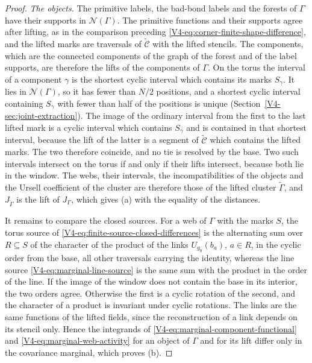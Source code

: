 \documentclass[11pt]{article}
\numberwithin{equation}{section}
\theoremstyle{remark}
\theoremstyle{plain}
\begin{document}
\begin{proof}
\emph{The objects.} The primitive labels, the bad-bond labels and the forests of $\Gamma$ have their supports in $\mathscr N(\Gamma)$. The primitive functions and their supports agree after lifting, as in the comparison preceding \eqref{V4-eq:corner-finite-shape-difference}, and the lifted marks are traversals of $\widetilde{\mathcal C}$ with the lifted stencils. The components, which are the connected components of the graph of the forest and of the label supports, are therefore the lifts of the components of $\Gamma$. On the torus the interval of a component $\gamma$ is the shortest cyclic interval which contains its marks $S_{\gamma}$. It lies in $\mathscr N(\Gamma)$, so it has fewer than $N/2$ positions, and a shortest cyclic interval containing $S_{\gamma}$ with fewer than half of the positions is unique (Section~\ref{V4-sec:joint-extraction}). The image of the ordinary interval from the first to the last lifted mark is a cyclic interval which contains $S_{\gamma}$ and is contained in that shortest interval, because the lift of the latter is a segment of $\widetilde{\mathcal C}$ which contains the lifted marks. The two therefore coincide, and no tie is resolved by the base. Two such intervals intersect on the torus if and only if their lifts intersect, because both lie in the window. The webs, their intervals, the incompatibilities of the objects and the Ursell coefficient of the cluster are therefore those of the lifted cluster $\widetilde\Gamma$, and $J_{\widetilde\Gamma}$ is the lift of $J_{\Gamma}$, which gives (a) with the equality of the distances.

It remains to compare the closed sources. For a web of $\Gamma$ with the marks $S$, the torus source of \eqref{V4-eq:finite-source-closed-differences} is the alternating sum over $R\subseteq S$ of the character of the product of the links $U_{g_0}(b_a)$, $a\in R$, in the cyclic order from the base, all other traversals carrying the identity, whereas the line source \eqref{V4-eq:marginal-line-source} is the same sum with the product in the order of the line. If the image of the window does not contain the base in its interior, the two orders agree. Otherwise the first is a cyclic rotation of the second, and the character of a product is invariant under cyclic rotations. The links are the same functions of the lifted fields, since the reconstruction of a link depends on its stencil only. Hence the integrands of \eqref{V4-eq:marginal-component-functional} and \eqref{V4-eq:marginal-web-activity} for an object of $\Gamma$ and for its lift differ only in the covariance marginal, which proves (b).


\end{proof}
\end{document}
